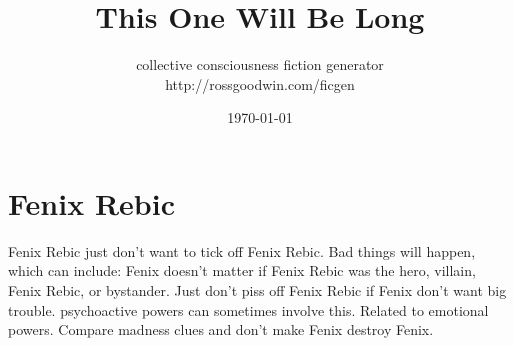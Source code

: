 \documentclass[12pt]{book}
\title{This One Will Be Long}
\author{collective consciousness fiction generator\\http://rossgoodwin.com/ficgen}
\date{\today}
\begin{document}
\maketitle



\chapter{Fenix Rebic}

Fenix Rebic just don't want to tick off Fenix Rebic. Bad things will happen, which can include: Fenix doesn't matter if Fenix Rebic was the hero, villain, Fenix Rebic, or bystander. Just don't piss off Fenix Rebic if Fenix don't want big trouble. psychoactive powers can sometimes involve this. Related to emotional powers. Compare madness clues and don't make Fenix destroy Fenix.
\end{document}

